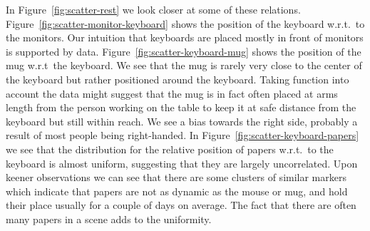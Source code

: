 \documentclass[letterpaper, 10 pt, conference]{ieeeconf}  %
\begin{document}
In Figure~\ref{fig:scatter-rest} we look closer at some of these relations. 
Figure~\ref{fig:scatter-monitor-keyboard} shows the position of 
the keyboard w.r.t.\ to the monitors. Our intuition that keyboards are 
placed mostly in front of monitors is supported by data. 
Figure~\ref{fig:scatter-keyboard-mug} shows the position of the mug w.r.t\ 
the keyboard. We see that the mug is rarely very close to the center of the 
keyboard but rather positioned around the keyboard. Taking function into 
account the data might suggest that the mug 
is in fact often placed at arms length from the person working on the table 
to keep it at safe distance from the keyboard but still within 
reach. We see a bias towards the right side, probably a result of most 
people being right-handed. In Figure~\ref{fig:scatter-keyboard-papers} we see 
that the distribution for the relative position of papers w.r.t.\ to the 
keyboard is almost uniform, suggesting that they are largely uncorrelated. 
Upon keener observations we can see that there are some clusters of similar 
markers which indicate that papers are not as dynamic as the mouse or mug, 
and hold their place usually for a couple of days on average. 
The fact that there are often many papers in a scene adds to the uniformity.
\end{document}
